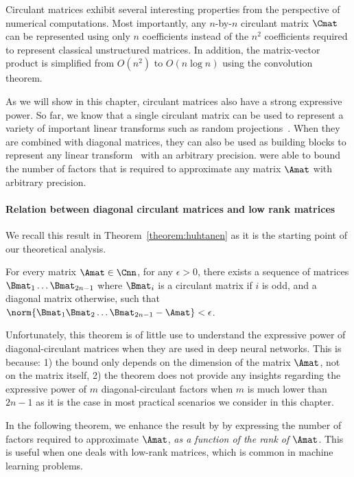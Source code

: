 Circulant matrices exhibit several interesting properties from the perspective of numerical computations.
Most importantly, any $n$-by-$n$ circulant matrix $\Cmat$ can be represented using only $n$ coefficients instead of the $n^2$ coefficients required to represent classical unstructured matrices.
In addition, the matrix-vector product is simplified from $O(n^2)$ to $O(n \log n)$ using the  convolution theorem.

As we will show in this chapter, circulant matrices also have a strong expressive power.
So far, we know that a single circulant matrix can be used to represent a variety of important linear transforms such as random projections~\cite{hinrichs2011johnson}. 
When they are combined with diagonal matrices, they can also be used as building blocks to represent any linear transform~\cite{schmid2000decomposing, Huhtanen2015} with an arbitrary precision.
\citet{Huhtanen2015} were able to bound the number of factors that is required to approximate any matrix $\Amat$ with arbitrary precision.

\paragraph{Relation between diagonal circulant matrices and low rank matrices}
We recall this result in Theorem~\ref{theorem:huhtanen} as it is the starting point of our theoretical analysis.

\begin{theorem} \label{theorem:huhtanen}
  For every matrix $\Amat \in \Cnn$, for any $\epsilon > 0$, there exists a sequence of matrices $\Bmat_1 \ldots \Bmat_{2n-1}$ where $\Bmat_{i}$ is a circulant matrix if $i$ is odd, and a diagonal matrix otherwise, such that $\norm{\Bmat_{1} \Bmat_{2} \ldots \Bmat_{2n-1} - \Amat} < \epsilon$.
\end{theorem}

Unfortunately, this theorem is of little use to understand the expressive power of diagonal-circulant matrices when they are used in deep neural networks.
This is because: 1) the bound only depends on the dimension of the matrix $\Amat$, not on the matrix itself, 2) the theorem does not provide any insights regarding the expressive power of $m$ diagonal-circulant factors when $m$ is much lower than $2n - 1$ as it is the case in most practical scenarios we consider in this chapter. 

In the following theorem, we enhance the result by \citet{Huhtanen2015} by expressing the number of factors required to approximate $\Amat$, \emph{as a function of the rank of $\Amat$}.
This is useful when one deals with low-rank matrices, which is common in machine learning problems. 

